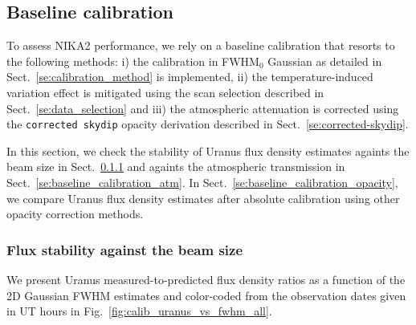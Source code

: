 

\subsection{Baseline calibration}
\label{se:baseline_calibration}

To assess NIKA2 performance, we rely on a baseline calibration that
resorts to the following methods: i) the calibration in FWHM$_0$ Gaussian
as detailed in Sect.~\ref{se:calibration_method} is implemented, ii)
the temperature-induced variation effect is mitigated using the scan
selection described in Sect.~\ref{se:data_selection} and iii) the
atmospheric attenuation is corrected using the {\tt corrected skydip}
opacity derivation described in Sect.~\ref{se:corrected-skydip}.

In this section, we check the stability of Uranus flux density
estimates againts the beam size in
Sect.~\ref{se:baseline_calibration_scans} and againts the
atmospheric transmission in
Sect.~\ref{se:baseline_calibration_atm}. In
Sect.~\ref{se:baseline_calibration_opacity}, we compare
Uranus flux density estimates after absolute calibration using other
opacity correction methods.

\subsubsection{Flux stability against the beam size}
\label{se:baseline_calibration_scans}
We present Uranus measured-to-predicted flux density ratios as a
function of the 2D Gaussian FWHM estimates and color-coded from the
observation dates given in UT hours in
Fig.~\ref{fig:calib_uranus_vs_fwhm_all}.

